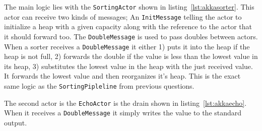 \documentclass{ituhandin}
\begin{document}
The main logic lies with the \texttt{SortingActor} shown in listing~\ref{lst:akkasorter}. This actor can receive two kinds of messages; An \texttt{InitMessage} telling the actor to initialize a heap with a given capacity along with the reference to the actor that it should forward too. The \texttt{DoubleMessage} is used to pass doubles between actors. When a sorter receives a \texttt{DoubleMessage} it either 1) puts it into the heap if the heap is not full, 2) forwards the double if  the value is less than the lowest value in its heap, 3) substitutes the lowest value in the heap with the just received value. It forwards the lowest value and then reorganizes it's heap. This is the exact same logic as the \texttt{SortingPipleline} from previous questions.

The second actor is the \texttt{EchoActor} is the drain shown in listing~\ref{lst:akkaecho}. When it receives a \texttt{DoubleMessage} it simply writes the value to the standard output.
\end{document}
